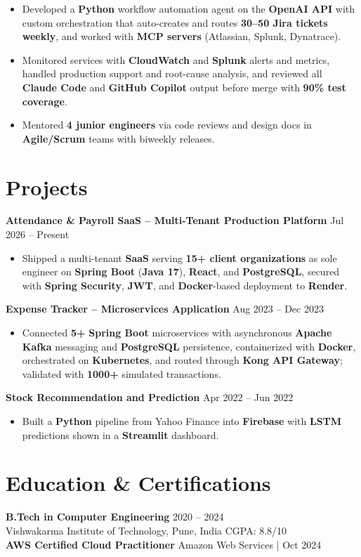 \documentclass[a4paper,10pt]{article}
\begin{document}
\begin{itemize}[leftmargin=*]
    \item Developed a \textbf{Python} workflow automation agent on the \textbf{OpenAI API} with custom orchestration that auto-creates and routes \textbf{30--50 Jira tickets weekly}, and worked with \textbf{MCP servers} (Atlassian, Splunk, Dynatrace).
    \item Monitored services with \textbf{CloudWatch} and \textbf{Splunk} alerts and metrics, handled production support and root-cause analysis, and reviewed all \textbf{Claude Code} and \textbf{GitHub Copilot} output before merge with \textbf{90\% test coverage}.
    \item Mentored \textbf{4 junior engineers} via code reviews and design docs in \textbf{Agile/Scrum} teams with biweekly releases.
\end{itemize}

\section*{Projects}

\textbf{Attendance \& Payroll SaaS -- Multi-Tenant Production Platform} \hfill Jul 2026 -- Present
\begin{itemize}[leftmargin=*]
    \item Shipped a multi-tenant \textbf{SaaS} serving \textbf{15+ client organizations} as sole engineer on \textbf{Spring Boot} (\textbf{Java 17}), \textbf{React}, and \textbf{PostgreSQL}, secured with \textbf{Spring Security}, \textbf{JWT}, and \textbf{Docker}-based deployment to \textbf{Render}.
\end{itemize}

\textbf{Expense Tracker -- Microservices Application} \hfill Aug 2023 -- Dec 2023
\begin{itemize}[leftmargin=*]
    \item Connected \textbf{5+} \textbf{Spring Boot} microservices with asynchronous \textbf{Apache Kafka} messaging and \textbf{PostgreSQL} persistence, containerized with \textbf{Docker}, orchestrated on \textbf{Kubernetes}, and routed through \textbf{Kong API Gateway}; validated with \textbf{1000+} simulated transactions.
\end{itemize}

\textbf{Stock Recommendation and Prediction} \hfill Apr 2022 -- Jun 2022
\begin{itemize}[leftmargin=*]
    \item Built a \textbf{Python} pipeline from Yahoo Finance into \textbf{Firebase} with \textbf{LSTM} predictions shown in a \textbf{Streamlit} dashboard.
\end{itemize}

\section*{Education \& Certifications}
\textbf{B.Tech in Computer Engineering} \hfill 2020 -- 2024 \\
Vishwakarma Institute of Technology, Pune, India \hfill CGPA: 8.8/10 \\
\textbf{AWS Certified Cloud Practitioner} \hfill Amazon Web Services \;|\; Oct 2024
\end{document}
